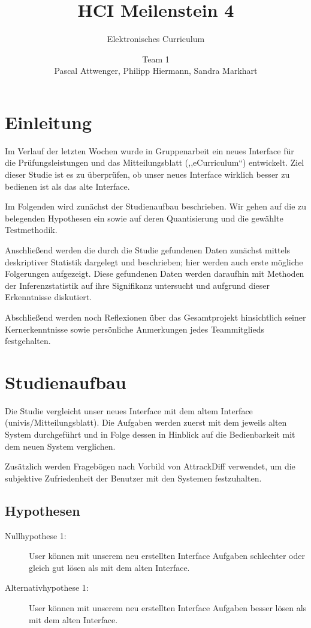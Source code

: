 \documentclass[a4paper,10pt]{scrartcl}
\title{HCI Meilenstein 4}
\subtitle{Elektronisches Curriculum}
\author{Team 1 \\Pascal Attwenger, Philipp Hiermann, Sandra Markhart}
\begin{document}
\maketitle

\section{Einleitung}

Im Verlauf der letzten Wochen wurde in Gruppenarbeit ein neues Interface für die Prüfungsleistungen und das Mitteilungsblatt (,,eCurriculum``) entwickelt.
Ziel dieser Studie ist es zu überprüfen, ob unser neues Interface wirklich besser zu bedienen ist als das alte Interface.

\medskip

Im Folgenden wird zunächst der Studienaufbau beschrieben. Wir gehen auf die zu belegenden Hypothesen ein sowie auf deren Quantisierung und die gewählte Testmethodik.

Anschließend werden die durch die Studie gefundenen Daten zunächst mittels deskriptiver Statistik dargelegt und beschrieben; hier werden auch erste mögliche Folgerungen aufgezeigt. Diese gefundenen Daten werden daraufhin mit Methoden der Inferenzstatistik auf ihre Signifikanz untersucht und aufgrund dieser Erkenntnisse diskutiert.

Abschließend werden noch Reflexionen über das Gesamtprojekt hinsichtlich seiner Kernerkenntnisse sowie persönliche Anmerkungen jedes Teammitglieds festgehalten.

\section{Studienaufbau} 

Die Studie vergleicht unser neues Interface mit dem altem Interface (univis/Mitteilungsblatt). Die Aufgaben werden zuerst mit dem jeweils alten System durchgeführt und in Folge dessen in Hinblick auf die Bedienbarkeit mit dem neuen System verglichen.

Zusätzlich werden Fragebögen nach Vorbild von AttrackDiff verwendet, um die subjektive Zufriedenheit der Benutzer mit den Systemen festzuhalten.

\subsection{Hypothesen}


\begin{description}
 \item[Nullhypothese 1: ] User können mit unserem neu erstellten Interface Aufgaben schlechter oder gleich gut lösen als mit dem alten Interface. 
 \item[Alternativhypothese 1: ] User können mit unserem neu erstellten Interface Aufgaben besser lösen als mit dem alten Interface. 
\end{description}
\end{document}
